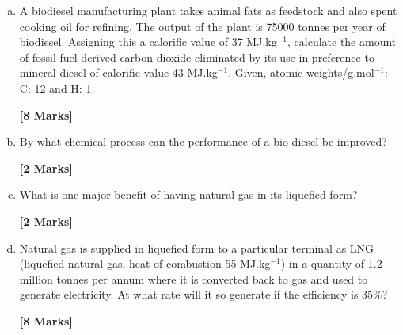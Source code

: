 \documentclass[calculator,refrigeranttables,datasheet,resit]{exam}
\begin{document}
\begin{question} \vspace{-2\baselineskip}

\begin{enumerate}[(a)]
\item A biodiesel manufacturing plant takes animal fats as feedstock and also spent cooking oil for refining. The output of the plant is 75000 tonnes per year of biodiesel.  Assigning this a calorific value of 37 MJ.kg$^{-1}$, calculate the amount of fossil fuel derived carbon dioxide eliminated by its use in preference to mineral diesel of calorific value 43 MJ.kg$^{-1}$. Given, atomic weights/g.mol$^{-1}$: C: 12 and H: 1. 
\begin{flushright}
{\bf [8 Marks]}
\end{flushright} 

\item By what chemical process can the performance of a bio-diesel be improved?
\begin{flushright}
{\bf [2 Marks]}
\end{flushright}

\item What is one major benefit of having natural gas in its liquefied form?
\begin{flushright}
{\bf [2 Marks]}
\end{flushright} 

\item Natural gas is supplied in liquefied form to a particular terminal as LNG (liquefied natural gas, heat of combustion 55 MJ.kg$^{-1}$) in a quantity of 1.2 million tonnes per annum where it is converted back to gas and used to generate electricity. At what rate will it so generate if the efficiency is 35$\%$?
\begin{flushright}
{\bf [8 Marks]}
\end{flushright} 
\end{enumerate} 

\end{question}

\clearpage
\end{document}
